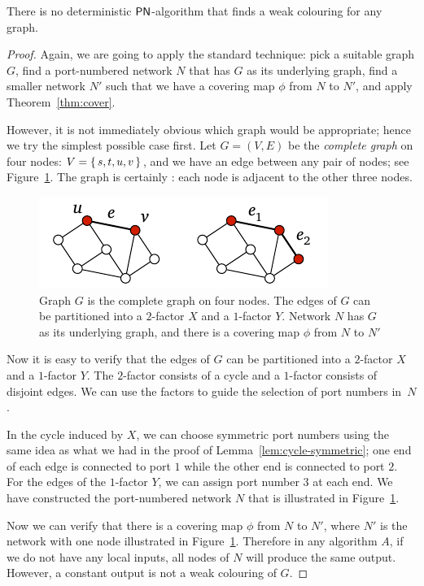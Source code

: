 \begin{lemma}
    There is no deterministic $\textup{\sffamily PN}$-algorithm that finds a weak colouring for any  graph.
\end{lemma}
\begin{proof}
    Again, we are going to apply the standard technique: pick a suitable  graph $G$, find a port-numbered network $N$ that has $G$ as its underlying graph, find a smaller network $N'$ such that we have a covering map $\phi$ from $N$ to $N'$, and apply Theorem~\ref{thm:cover}.
    
    However, it is not immediately obvious which  graph would be appropriate; hence we try the simplest possible case first. Let $G = (V,E)$ be the \emph{complete graph} on four nodes: $V = \{\, s,t,u,v \,\}$, and we have an edge between any pair of nodes; see Figure~\ref{fig:three-reg}. The graph is certainly : each node is adjacent to the other three nodes.

    \begin{figure}
        \centering
        \includegraphics[page=\PThreeReg]{figs.pdf}
        \caption{Graph $G$ is the complete graph on four nodes. The edges of $G$ can be partitioned into a $2$-factor $X$ and a $1$-factor $Y$. Network $N$ has $G$ as its underlying graph, and there is a covering map $\phi$ from $N$ to $N'$}\label{fig:three-reg}
    \end{figure}
        
    Now it is easy to verify that the edges of $G$ can be partitioned into a $2$-factor $X$ and a $1$-factor $Y$. The $2$-factor consists of a cycle and a $1$-factor consists of disjoint edges. We can use the factors to guide the selection of port numbers in~$N$.
    
    In the cycle induced by $X$, we can choose symmetric port numbers using the same idea as what we had in the proof of Lemma~\ref{lem:cycle-symmetric}; one end of each edge is connected to port $1$ while the other end is connected to port $2$. For the edges of the $1$-factor $Y$, we can assign port number $3$ at each end. We have constructed the port-numbered network $N$ that is illustrated in Figure~\ref{fig:three-reg}.
    
    Now we can verify that there is a covering map $\phi$ from $N$ to $N'$, where $N'$ is the network with one node illustrated in Figure~\ref{fig:three-reg}. Therefore in any algorithm $A$, if we do not have any local inputs, all nodes of $N$ will produce the same output. However, a constant output is not a weak colouring of $G$.
\end{proof}

